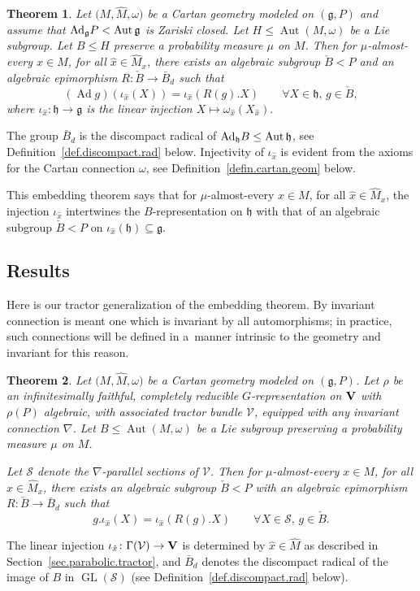 \documentclass[10pt,a4paper]{amsart}
\numberwithin{equation}{section}
\newtheorem{thm}{Theorem}[section]
\theoremstyle{definition}
\def\V{{\bf V}}
\newcommand{\cV}{{\mathcal V}}
\newcommand{\lieg}{\mathfrak{g}}
\newcommand{\lieh}{\mathfrak{h}}
\newcommand{\Ad}{\operatorname{Ad}}
\newcommand{\GL}{{\operatorname{GL}}}
\begin{document}
\begin{thm}%
Let $\bigl(M, \hat{M}, \omega\bigr)$ be a Cartan geometry modeled on $(\lieg,P)$ and assume that ${\rm Ad}_{\lieg} P<\operatorname{Aut} \lieg$ is Zariski closed. Let $H\leq\operatorname{Aut}(M,\omega)$ be a Lie subgroup. Let $B \leq H$ preserve a probability measure $\mu$ on $M$. Then for $\mu$-almost-every $x\in M$, for all $\hat x\in\hat M_x$, there exists an algebraic subgroup $\check B<P$ and an algebraic epimorphism
$R\colon \check{B} \rightarrow \bar{B}_d$ such that
\[ (\Ad g) (\iota_{\hat{x}} (X)) = \iota_{\hat{x}} ( R(g). X ) \qquad \forall X \in \mathcal{\lieh},\, g \in \check{B},\]
where $\iota_{\hat{x}} \colon \lieh \rightarrow \lieg$ is the linear injection $X \mapsto \omega_{\hat{x}}(X_{\hat{x}}).$
\end{thm}
\noindent The group $\bar{B}_d$ is the discompact radical of ${\rm Ad}_{\lieh} B \leq \operatorname{Aut} \lieh$, see Definition~\ref{def.discompact.rad} below. Injectivity of $\iota_{\hat{x}}$ is evident from the axioms for the Cartan connection $\omega$, see Definition~\ref{defin.cartan.geom} below.


This embedding theorem says that for $\mu$-almost-every $x \in M$, for all $\hat{x} \in \hat{M}_x$, the injection $\iota_{\hat{x}}$ intertwines the $B$-representation on $\lieh$ with that of an algebraic subgroup $\check{B} < P$ on $\iota_{\hat{x}}(\lieh) \subseteq \lieg$.

\subsection{Results}

Here is our tractor generalization of the embedding theorem. By invariant connection is meant one which is invariant by all automorphisms; in practice, such connections will be defined in a~manner intrinsic to the geometry and invariant for this reason.

\begin{thm}
\label{thm.embedding-0}
 Let $\bigl(M, \hat{M}, \omega\bigr)$ be a Cartan geometry modeled on $(\lieg,P)$. Let $\rho$ be an infinitesimally faithful, completely reducible $G$-representation on $\V$ with $\rho(P)$ algebraic, with associated tractor bundle $\mathcal{V}$, equipped with any invariant connection $\nabla$.
 Let $B \leq \operatorname{Aut}(M,\omega)$ be a Lie subgroup preserving a
 probability measure $\mu$ on $M$.

Let $\mathcal{S}$ denote the $\nabla$-parallel sections of $\cV$.
Then for $\mu$-almost-every $x \in M$, for all $\hat{x} \in \hat{M}_x$, there exists
an algebraic subgroup $\check{B} <P$ with an algebraic epimorphism $R\colon \check{B} \rightarrow \bar{B}_d$ such that
\[ g .\iota_{\hat{x}} (X) = \iota_{\hat{x}} \left( R(g). X \right) \qquad \forall X \in \mathcal{S},\, g \in \check{B}.\]

\end{thm}
\noindent The linear injection $\iota_{\hat{x}}\colon \Gamma(\mathcal{V}) \rightarrow {\bf V}$ is determined by $\hat{x} \in \hat{M}$ as described in Section~\ref{sec.parabolic.tractor}, and $\bar{B}_d$ denotes the discompact radical of the image of $B$ in $\GL(\mathcal{S})$ (see Definition~\ref{def.discompact.rad} below).
\end{document}
